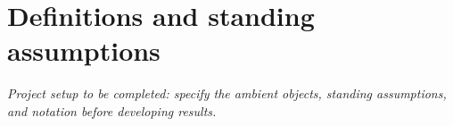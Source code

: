 \section{Definitions and standing assumptions}

\emph{Project setup to be completed: specify the ambient objects, standing
assumptions, and notation before developing results.}

